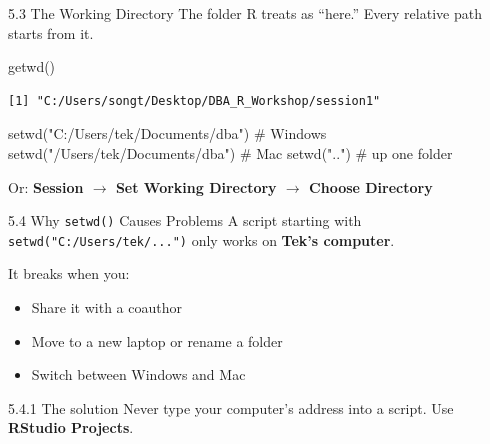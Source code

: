 \documentclass[
  ignorenonframetext,
  aspectratio=169,
]{beamer}
\newenvironment{Shaded}{\begin{snugshade}}{\end{snugshade}}
\newcommand{\CommentTok}[1]{\textcolor[rgb]{0.37,0.37,0.37}{#1}}
\newcommand{\FunctionTok}[1]{\textcolor[rgb]{0.28,0.35,0.67}{#1}}
\newcommand{\NormalTok}[1]{\textcolor[rgb]{0.00,0.23,0.31}{#1}}
\newcommand{\StringTok}[1]{\textcolor[rgb]{0.13,0.47,0.30}{#1}}
\providecommand{\tightlist}{%
  \setlength{\itemsep}{0pt}\setlength{\parskip}{0pt}}
\begin{document}
\begin{frame}[fragile]{5.3 The Working Directory}
\protect{}\label{the-working-directory}
The folder R treats as ``here.'' Every relative path starts from it.

\begin{Shaded}
\begin{Highlighting}[]
\FunctionTok{getwd}\NormalTok{()}
\end{Highlighting}
\end{Shaded}

\begingroup\tiny\color{darkgray}

\begin{verbatim}
[1] "C:/Users/songt/Desktop/DBA_R_Workshop/session1"
\end{verbatim}

\endgroup

\begin{Shaded}
\begin{Highlighting}[]
\FunctionTok{setwd}\NormalTok{(}\StringTok{"C:/Users/tek/Documents/dba"}\NormalTok{)   }\CommentTok{\# Windows}
\FunctionTok{setwd}\NormalTok{(}\StringTok{"/Users/tek/Documents/dba"}\NormalTok{)     }\CommentTok{\# Mac}
\FunctionTok{setwd}\NormalTok{(}\StringTok{".."}\NormalTok{)                           }\CommentTok{\# up one folder}
\end{Highlighting}
\end{Shaded}

Or: \textbf{Session \(\rightarrow\) Set Working Directory
\(\rightarrow\) Choose Directory}
\end{frame}

\begin{frame}[fragile]{5.4 Why \texttt{setwd()} Causes Problems}
\protect{}\label{why-setwd-causes-problems}
A script starting with \texttt{setwd("C:/Users/tek/...")} only works on
\textbf{Tek's computer}.

It breaks when you:

\begin{itemize}
\tightlist
\item
  Share it with a coauthor
\item
  Move to a new laptop or rename a folder
\item
  Switch between Windows and Mac
\end{itemize}

\begin{exampleblock}{5.4.1 The solution}
\protect{}\label{the-solution}
Never type your computer's address into a script. Use \textbf{RStudio
Projects}.
\end{exampleblock}
\end{frame}
\end{document}
